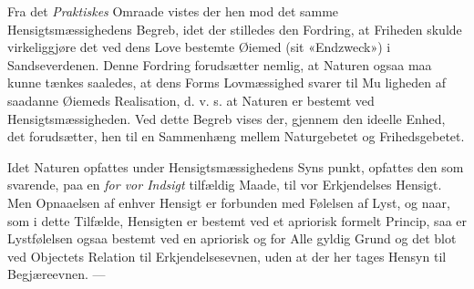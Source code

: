\documentclass[12pt,a4paper]{book}
\begin{document}
Fra det \emph{Praktiskes} Omraade vistes der hen mod det
samme Hensigtsmæssighedens Begreb, idet der stilledes den
Fordring, at Friheden skulde virkeliggjøre det ved dens Love
bestemte Øiemed (sit «Endzweck») i Sandseverdenen. Denne
Fordring forudsætter nemlig, at Naturen ogsaa maa kunne
tænkes saaledes, at dens Forms Lovmæssighed svarer til Mu\-%
ligheden af saadanne Øiemeds Realisation, d. v. s. at Naturen
er bestemt ved Hensigtsmæssigheden. Ved dette Begreb vises
der, gjennem den ideelle Enhed, det forudsætter, hen til
en Sammenhæng mellem Naturgebetet og Frihedsgebetet.

Idet Naturen opfattes under Hensigtsmæssighedens Syns\-%
punkt, opfattes den som svarende, paa en \emph{for vor Indsigt}
tilfældig Maade, til vor Erkjendelses Hensigt. Men Opnaaelsen
af enhver Hensigt er forbunden med Følelsen af Lyst, og naar,
som i dette Tilfælde, Hensigten er bestemt ved et apriorisk
formelt Princip, saa er Lystfølelsen ogsaa bestemt ved en
apriorisk og for Alle gyldig Grund og det blot ved Objectets
Relation til Erkjendelsesevnen, uden at der her tages Hensyn
til Begjæreevnen. ---
\end{document}
